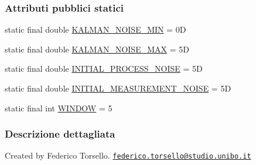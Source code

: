 \subsubsection*{Attributi pubblici statici}
\begin{DoxyCompactItemize}
\item 
static final double \hyperlink{classit_1_1unibo_1_1torsello_1_1bluetoothpositioning_1_1constant_1_1KFilterConstants_a8c2adefc8bfb7c419ecfbe3b7ce65112_a8c2adefc8bfb7c419ecfbe3b7ce65112}{K\+A\+L\+M\+A\+N\+\_\+\+N\+O\+I\+S\+E\+\_\+\+M\+IN} = 0D
\item 
static final double \hyperlink{classit_1_1unibo_1_1torsello_1_1bluetoothpositioning_1_1constant_1_1KFilterConstants_aaaf950270c408cc26a79103a56b211cf_aaaf950270c408cc26a79103a56b211cf}{K\+A\+L\+M\+A\+N\+\_\+\+N\+O\+I\+S\+E\+\_\+\+M\+AX} = 5D
\item 
static final double \hyperlink{classit_1_1unibo_1_1torsello_1_1bluetoothpositioning_1_1constant_1_1KFilterConstants_a4604515ac01c25cfabb53248942a00bb_a4604515ac01c25cfabb53248942a00bb}{I\+N\+I\+T\+I\+A\+L\+\_\+\+P\+R\+O\+C\+E\+S\+S\+\_\+\+N\+O\+I\+SE} = 5D
\item 
static final double \hyperlink{classit_1_1unibo_1_1torsello_1_1bluetoothpositioning_1_1constant_1_1KFilterConstants_a5fa646024e9357b089f380b9293f914f_a5fa646024e9357b089f380b9293f914f}{I\+N\+I\+T\+I\+A\+L\+\_\+\+M\+E\+A\+S\+U\+R\+E\+M\+E\+N\+T\+\_\+\+N\+O\+I\+SE} = 5D
\item 
static final int \hyperlink{classit_1_1unibo_1_1torsello_1_1bluetoothpositioning_1_1constant_1_1KFilterConstants_a3c2618e53ad77fcb50785f62868e4c9c_a3c2618e53ad77fcb50785f62868e4c9c}{W\+I\+N\+D\+OW} = 5
\end{DoxyCompactItemize}


\subsubsection{Descrizione dettagliata}
Created by Federico Torsello. \href{mailto:federico.torsello@studio.unibo.it}{\tt federico.\+torsello@studio.\+unibo.\+it} 

